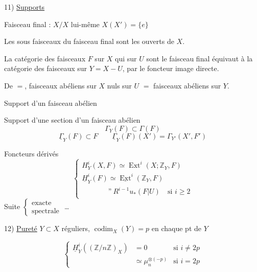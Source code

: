 
11) \uline{Supports}

 Faisceau final : $X/X$ lui-même \qquad $X(X')=\{e\}$

Les sous faisceaux du faisceau final sont les ouverts de $X$.


La catégorie des faisceaux $F$ sur $X$ qui sur $U$ sont le faisceau final équivaut à la catégorie des faisceaux sur $Y=X-U$, par le foncteur image directe.

De $=$, faisceaux abéliens sur $X$ nuls sur $U$ $=$ faisceaux abéliens sur $Y$.

Support d'un faisceau abélien


Support d'une section d'un faisceau abélien
\[
\Gamma_Y(F)\subset\Gamma(F)
\]
\[
\underline\Gamma_Y(F)\subset F
\qquad
\underline\Gamma_Y(F)(X')=\Gamma_{Y'}(X',F')
\]

Foncteurs dérivés
\[
\left\{\begin{array}{l}
H^i_Y(X,F)\simeq\operatorname{Ext}^i(X;\mathbb Z_Y,F)\\
\underline H^i_Y(F)\simeq\underline{\operatorname{Ext}}^i(\mathbb Z_Y,F)\\
\phantom{\underline H^i_Y(F)}\text{''}\ R^{i-1}u_*(F|U)\quad\text{si }i\geq2
\end{array}\right.
\]
Suite $\left\{\begin{array}{l}\text{exacte}\\\text{spectrale}\end{array}\right.$ \ldots

12) \uline{Pureté}
$Y\subset X$ réguliers, $\operatorname{codim}_X(Y)=p$ en chaque pt de $Y$

\[
\left\{\begin{array}{lll}
\underline H^i_Y((\mathbb Z/n\mathbb Z)_X)&=0&\text{si }i\ne2p\\
&\simeq\mu_n^{\otimes(-p)}&\text{si }i=2p
\end{array}\right.
\]
